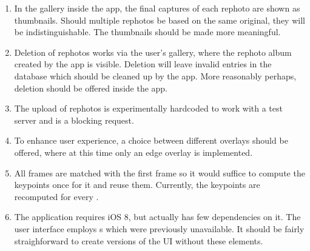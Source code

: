 \begin{enumerate}
   \item In the gallery inside the app, the final captures of each rephoto are
      shown as thumbnails. Should multiple rephotos be based on the same
      original, they will be indistinguishable. The thumbnails should be made
      more meaningful.

   \item Deletion of rephotos works via the user's gallery, where the rephoto
      album created by the app is visible. Deletion will leave invalid entries
      in the database which should be cleaned up by the app. More reasonably
      perhaps, deletion should be offered inside the app.


   \item The upload of rephotos is experimentally hardcoded to work with a test
      server and is a blocking request.

   \item To enhance user experience, a choice between different overlays should
      be offered, where at this time only an edge overlay is implemented.

   \item All frames are matched with the first frame so it would suffice to
      compute the keypoints once for it and reuse them. Currently, the keypoints
      are recomputed for every .

   \item The application requires iOS 8, but actually has few dependencies on
      it. The user interface employs s which were
      previously unavailable. It should be fairly straighforward to create
      versions of the UI without these elements.


\end{enumerate}
